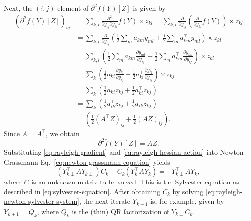 {Next, the $(i,j)$ element of $\partial^2f(Y)[Z]$ is given by}
\[\begin{aligned}
(\partial^2f(Y)[Z])_{ij}&=\sum_{k,l}\frac{\partial^2}{\partial y_{ij}\partial y_{kl}}f(Y)\times z_{kl}
=\sum_{k,l}\frac{\partial}{\partial y_{ij}}\left(\frac{\partial}{\partial y_{kl}}f(Y)\right)\times z_{kl}\\
&=\sum_{k,l}\frac{\partial}{\partial y_{ij}}\left(\frac12\sum_ma_{km}y_{ml}+\frac12\sum_ma_{km}^{\top}y_{ml}\right)\times z_{kl}\\
&=\sum_{k,l}\left(\frac12\sum_ma_{km}\frac{\partial y_{ml}}{\partial y_{ij}}+\frac12\sum_ma_{km}^{\top}\frac{\partial y_{ml}}{\partial y_{ij}}\right)\times z_{kl}\\
&=\sum_k\left(\frac12a_{ki}\frac{\partial y_{ij}}{\partial y_{ij}}+\frac12a_{ki}^{\top}\frac{\partial y_{ij}}{\partial y_{ij}}\right)\times z_{kj}\\
&=\sum_k\left(\frac12a_{ki}z_{kj}+\frac12a_{ki}^{\top}z_{kj}\right)\\
&=\sum_k\left(\frac12a_{ik}^{\top}z_{kj}+\frac12a_{ik}z_{kj}\right)\\
&=\left(\frac12(A^{\top}Z)_{ij}+\frac12(AZ)_{ij}\right).
\end{aligned}\]
{Since $A=A^{\top}$, we obtain}
\begin{equation}\label{eq:rayleigh-hessian-action}
\partial^2\bar f(Y)[Z]=AZ.
\end{equation}
{Substituting \eqref{eq:rayleigh-gradient} and \eqref{eq:rayleigh-hessian-action} into Newton--Grassmann Eq.\ \eqref{eq:newton-grassmann-equation} yields}
\begin{equation}\label{eq:rayleigh-newton-sylvester-system}
(Y_{k\perp}^{\top}AY_{k\perp})C_k-C_k(Y_k^{\top}AY_k)=-Y_{k\perp}^{\top}AY_k,
\end{equation}
{where $C$ is an unknown matrix to be solved. This is the Sylvester equation as described in \eqref{eq:sylvester-equation}. After obtaining $C_k$ by solving \eqref{eq:rayleigh-newton-sylvester-system}, the next iterate $Y_{k+1}$ is, for example, given by $Y_{k+1}=Q_k$, where $Q_k$ is the (thin) QR factorization of $Y_{k\perp}C_k$.}
